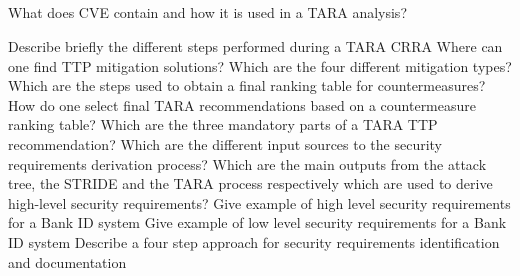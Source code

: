\begin{questions}
\begin{parts}
  \part{} What does CVE contain and how it is used in a TARA analysis?
  \end{parts}

\question{} Describe briefly the different steps performed during a TARA CRRA
\question{} Where can one find TTP mitigation solutions?
\question{} Which are the four different mitigation types?
\question{} Which are the steps used to obtain a final ranking table for countermeasures?
\question{} How do one select final TARA recommendations based on a countermeasure ranking table?
\question{} Which are the three mandatory parts of a TARA TTP recommendation?
\question{} Which are the different input sources to the security requirements derivation process?
\question{} Which are the main outputs from the attack tree, the STRIDE and the TARA process respectively which are used to derive high-level security requirements?
\question{} Give example of high level security requirements for a Bank ID system
\question{} Give example of low level security requirements  for a Bank ID system
\question{} Describe a four step approach for security requirements identification and documentation
\end{questions}

